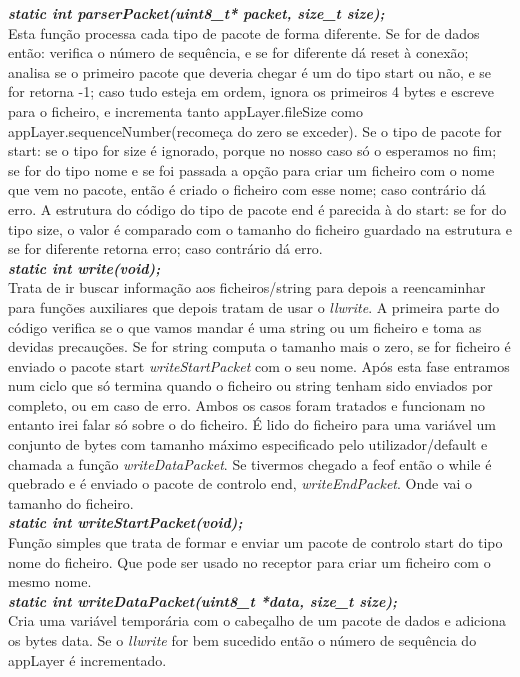 \documentclass[a4paper]{article}
\begin{document}
\noindent\textbf{\textit{static int parserPacket(uint8\_t* packet, size\_t
size);}}\\ Esta função processa cada tipo de pacote de forma diferente. Se for
de dados então: verifica o número de sequência, e se for diferente dá reset à
conexão; analisa se o primeiro pacote que deveria chegar é um do tipo start ou
não, e se for retorna -1; caso tudo esteja em ordem, ignora os primeiros 4
bytes e escreve para o ficheiro, e incrementa tanto appLayer.fileSize como
appLayer.sequenceNumber(recomeça do zero se exceder). Se o tipo de pacote for start:
se o tipo for size é ignorado, porque no nosso caso só o esperamos no fim;
se for do tipo nome e se foi passada a opção para criar um ficheiro com o
nome que vem no pacote, então é criado o ficheiro com esse nome; caso contrário
dá erro. A estrutura do código do tipo de pacote end é parecida à do start: se
for do tipo size, o valor é comparado com o tamanho do ficheiro guardado na
estrutura e se for diferente retorna erro; caso contrário dá erro.\\

\noindent\textbf{\textit{static int write(void);}}\\ Trata de ir buscar
informação aos ficheiros/string para depois a reencaminhar para funções
auxiliares que depois tratam de usar o \textit{llwrite}. A primeira parte do
código verifica se o que vamos mandar é uma string ou um ficheiro e toma as
devidas precauções. Se for string computa o tamanho mais o zero, se for
ficheiro é enviado o pacote start \textit{writeStartPacket} com o seu nome.
Após esta fase entramos num ciclo que só termina quando o ficheiro ou string
tenham sido enviados por completo, ou em caso de erro. Ambos os casos foram
tratados e funcionam no entanto irei falar só sobre o do ficheiro. É lido do
ficheiro para uma variável um conjunto de bytes com tamanho máximo especificado
pelo utilizador/default e chamada a função \textit{writeDataPacket}. Se
tivermos chegado a feof então o while é quebrado e é enviado o pacote de
controlo end, \textit{writeEndPacket}. Onde vai o tamanho do ficheiro.\\

\noindent\textbf{\textit{static int writeStartPacket(void);}}\\
Função simples que trata de formar e enviar um pacote de controlo start do tipo
nome do ficheiro. Que pode ser usado no receptor para criar um ficheiro com o
mesmo nome.\\

\noindent\textbf{\textit{static int writeDataPacket(uint8\_t *data, size\_t
size);}}\\
Cria uma variável temporária com o cabeçalho de um pacote de dados e adiciona
os bytes data. Se o \textit{llwrite} for bem sucedido então o número de
sequência do appLayer é incrementado.\\
\end{document}
